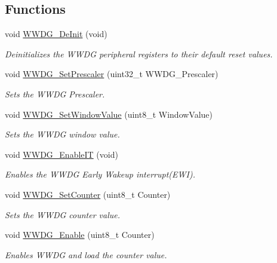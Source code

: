 \subsection*{Functions}
\begin{DoxyCompactItemize}
\item 
void \hyperlink{group___w_w_d_g___exported___functions_ga7130f4dc861b9234b62e73f9f57f89a1}{W\+W\+D\+G\+\_\+\+De\+Init} (void)
\begin{DoxyCompactList}\small\item\em Deinitializes the W\+W\+DG peripheral registers to their default reset values. \end{DoxyCompactList}\item 
void \hyperlink{group___w_w_d_g___exported___functions_gafeaa2b52c31ba7baca7eb61d2d42e07b}{W\+W\+D\+G\+\_\+\+Set\+Prescaler} (uint32\+\_\+t W\+W\+D\+G\+\_\+\+Prescaler)
\begin{DoxyCompactList}\small\item\em Sets the W\+W\+DG Prescaler. \end{DoxyCompactList}\item 
void \hyperlink{group___w_w_d_g___exported___functions_gaf44a7bf8bf6b11b41cd89ff521fdd5a5}{W\+W\+D\+G\+\_\+\+Set\+Window\+Value} (uint8\+\_\+t Window\+Value)
\begin{DoxyCompactList}\small\item\em Sets the W\+W\+DG window value. \end{DoxyCompactList}\item 
void \hyperlink{group___w_w_d_g___exported___functions_gac8af66ea5254d3d78b60b9b7c7f29521}{W\+W\+D\+G\+\_\+\+Enable\+IT} (void)
\begin{DoxyCompactList}\small\item\em Enables the W\+W\+DG Early Wakeup interrupt(\+E\+W\+I). \end{DoxyCompactList}\item 
void \hyperlink{group___w_w_d_g___exported___functions_ga6e44cc35f133b28b9ad861f459bf8d76}{W\+W\+D\+G\+\_\+\+Set\+Counter} (uint8\+\_\+t Counter)
\begin{DoxyCompactList}\small\item\em Sets the W\+W\+DG counter value. \end{DoxyCompactList}\item 
void \hyperlink{group___w_w_d_g___exported___functions_ga10dc2554d0b504b5472e3ecf0f02a9e6}{W\+W\+D\+G\+\_\+\+Enable} (uint8\+\_\+t Counter)
\begin{DoxyCompactList}\small\item\em Enables W\+W\+DG and load the counter value. \end{DoxyCompactList}\item 

\end{DoxyCompactItemize}
